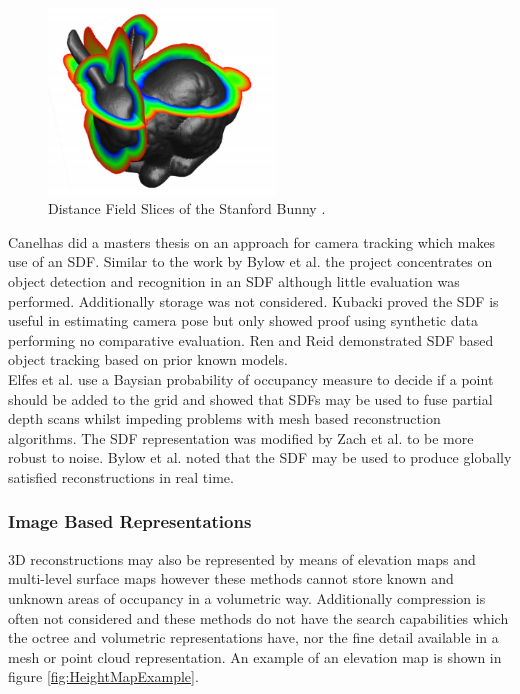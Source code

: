 \begin{figure}[!htb]
\centering
\includegraphics[width=6cm]{images/literature/SDFExample}
\caption{Distance Field Slices of the Stanford Bunny \cite{Sigg03Signed}.}
\label{fig:SDFExample}
\end{figure}

Canelhas \cite{Canelhas12Scene} did a masters thesis on an approach for camera tracking which makes use of an SDF. Similar to the work by Bylow et al. \cite{Bylow13Real} the project concentrates on object detection and recognition in an SDF although little evaluation was performed. Additionally storage was not considered. Kubacki \cite{Kubacki12Registration} proved the SDF is useful in estimating camera pose but only showed proof using synthetic data performing no comparative evaluation. Ren and Reid \cite{Ren12Unified}  demonstrated SDF based object tracking based on prior known models. \\

Elfes et al. \cite{Elfes87Sensor} use a Baysian probability of occupancy measure to decide if a point should be added to the grid and showed that SDFs may be used to fuse partial depth scans whilst impeding problems with mesh based reconstruction algorithms. The SDF representation was modified by Zach et al. \cite{Zach07Globally} to be more robust to noise. Bylow et al. noted that the SDF may be used to produce globally satisfied reconstructions in real time. \\


\subsubsection{Image Based Representations}

3D reconstructions may also be represented by means of elevation maps \cite{Herbert89Terrain} and multi-level surface maps \cite{Triebel06Multi} however these methods cannot store known and unknown areas of occupancy in a volumetric way. Additionally compression is often not considered and these methods do not have the search capabilities which the octree and volumetric representations have, nor the fine detail available in a mesh or point cloud representation. An example of an elevation map is shown in figure \ref{fig:HeightMapExample}.\\


